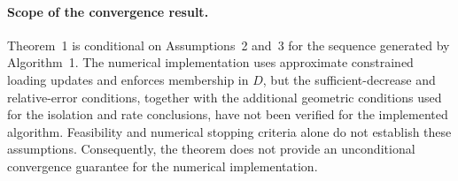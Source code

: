 \paragraph{Scope of the convergence result.}
Theorem~1 is conditional on Assumptions~2 and~3 for the sequence generated
by Algorithm~1. The numerical implementation uses approximate constrained
loading updates and enforces membership in $D$, but the sufficient-decrease
and relative-error conditions, together with the additional geometric
conditions used for the isolation and rate conclusions, have not been
verified for the implemented algorithm. Feasibility and numerical stopping
criteria alone do not establish these assumptions. Consequently, the theorem
does not provide an unconditional convergence guarantee for the numerical
implementation.

